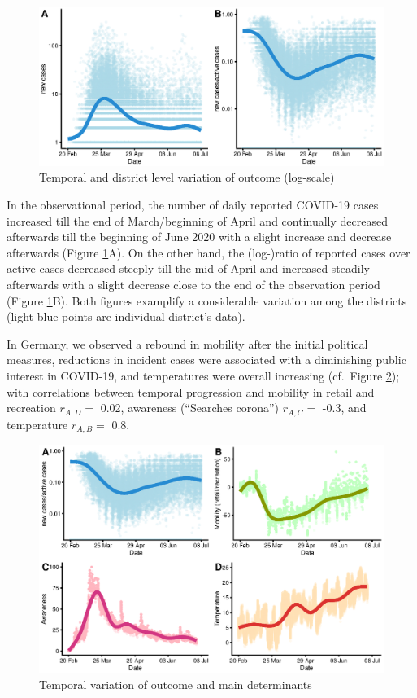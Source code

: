 \documentclass[]{elsarticle} %
\begin{document}
\begin{figure}
\centering
\includegraphics{figures/f_timeseries_cases_and_lograte.eps}
\caption{\label{fig:cases-log}Temporal and district level variation of outcome (log-scale)}
\end{figure}

In the observational period, the number of daily reported COVID-19 cases increased till the end of March/beginning of April and continually decreased afterwards till the beginning of June 2020 with a slight increase and decrease afterwards (Figure \ref{fig:cases-log}A). On the other hand, the (log-)ratio of reported cases over active cases decreased steeply till the mid of April and increased steadily afterwards with a slight decrease close to the end of the observation period (Figure \ref{fig:cases-log}B). Both figures examplify a considerable variation among the districts (light blue points are individual district's data).

In Germany, we observed a rebound in mobility after the initial political measures, reductions in incident cases were associated with a diminishing public interest in COVID-19, and temperatures were overall increasing (cf.~Figure \ref{fig:timeseries}); with correlations between temporal progression and mobility in retail and recreation \(r_{A,D}=\) 0.02, awareness (``Searches corona'') \(r_{A,C}=\) -0.3, and temperature \(r_{A,B}=\) 0.8.

\begin{figure}
\centering
\includegraphics{figures/f_timeseries_exposures.eps}
\caption{\label{fig:timeseries}Temporal variation of outcome and main determinants}
\end{figure}
\end{document}
